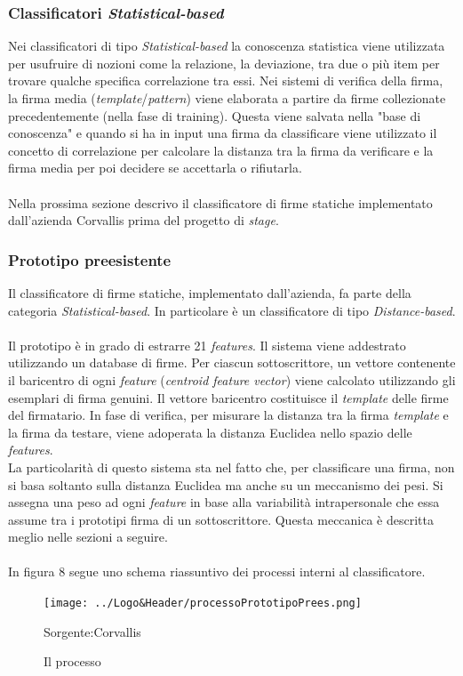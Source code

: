 \subsubsection*{Classificatori \emph{Statistical-based}}
\label{2.1.3.5}
Nei classificatori di tipo \emph{Statistical-based} la conoscenza statistica viene utilizzata per usufruire di nozioni come la relazione, la deviazione, tra due o più item per trovare qualche specifica correlazione tra essi. Nei sistemi di verifica della firma, la firma media (\emph{template}/\emph{pattern}) viene elaborata a partire da firme collezionate precedentemente (nella fase di training). Questa viene salvata nella "base di conoscenza" e quando si ha in input una firma da classificare viene utilizzato il concetto di correlazione per calcolare la distanza tra la firma da verificare e la firma media per poi decidere se accettarla o rifiutarla.\\\\
Nella prossima sezione descrivo il classificatore di firme statiche implementato dall'azienda Corvallis prima del progetto di \emph{stage}.
\subsubsection{Prototipo preesistente}
\label{2.1.4}
Il classificatore di firme statiche, implementato dall'azienda, fa parte della categoria \emph{Statistical-based}. In particolare è un classificatore di tipo \emph{Distance-based}.\\\\
Il prototipo è in grado di estrarre 21 \emph{features}.
Il sistema viene addestrato utilizzando un database di firme. Per ciascun sottoscrittore, un vettore contenente il baricentro di ogni \emph{feature} (\emph{centroid feature vector}) viene calcolato utilizzando gli esemplari di firma genuini. Il vettore baricentro costituisce il \emph{template} delle firme del firmatario. In fase di verifica, per misurare la distanza tra la firma \emph{template} e la firma da testare, viene adoperata la distanza Euclidea nello spazio delle \emph{features}.\\
La particolarità di questo sistema sta nel fatto che, per classificare una firma, non si basa soltanto sulla distanza Euclidea ma anche su un meccanismo dei pesi. Si assegna una peso ad ogni \emph{feature} in base alla variabilità intrapersonale che essa assume tra i prototipi firma di un sottoscrittore. Questa meccanica è descritta meglio nelle sezioni a seguire.\\\\
In figura 8 segue uno schema riassuntivo dei processi interni al classificatore.
\begin{figure}[H]
\centering
\texttt{[image: ../Logo\&Header/processoPrototipoPrees.png]}
\caption{Il processo}Sorgente:Corvallis
\end{figure}

